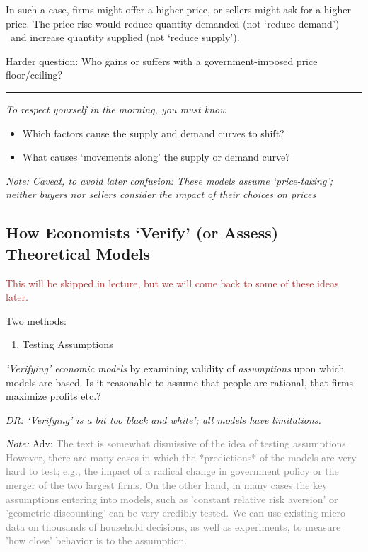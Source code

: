 \documentclass[]{article}
\providecommand{\tightlist}{%
  \setlength{\itemsep}{0pt}\setlength{\parskip}{0pt}}
\begin{document}
In such a case, firms might offer a higher price, or sellers might ask for a higher price. The price rise would reduce quantity demanded (not `reduce demand') ~and increase quantity supplied (not `reduce supply').

\bigskip

\textcolor{RawSienna}{Harder question: Who gains or suffers with a government-imposed price floor/ceiling?}

\begin{center}\rule{0.5\linewidth}{\linethickness}\end{center}

\emph{To respect yourself in the morning, you must know}

\begin{itemize}
\item
  Which factors cause the supply and demand curves to shift?
\item
  What causes `movements along' the supply or demand curve?
\end{itemize}

\emph{Note: Caveat, to avoid later confusion: These models assume `price-taking'; neither buyers nor sellers consider the impact of their choices on prices}

\hypertarget{how-economists-verify-or-assess-theoretical-models}{%
\subsection{How Economists `Verify' (or Assess) Theoretical Models}\label{how-economists-verify-or-assess-theoretical-models}}

\textcolor{brown}{This will be skipped in lecture, but we will come back to some of these ideas later.}

Two methods:

\begin{enumerate}
\def\labelenumi{\arabic{enumi}.}
\tightlist
\item
  Testing Assumptions
\end{enumerate}

\emph{`Verifying' economic models} by examining validity of \emph{assumptions} upon which models are based. Is it reasonable to assume that people are rational, that firms maximize profits etc.?

\emph{DR: `Verifying' is a bit too black and white'; all models have limitations.}

\bigskip

\emph{Note:} \textcolor{RawSienna}{Adv:} \textcolor{gray}{The text is somewhat dismissive of the idea of testing assumptions.  However, there are many cases in which the *predictions* of the models are very hard to test; e.g., the impact of a radical change in government policy or the merger of the two largest firms.  On the other hand, in many cases the key assumptions entering into models, such as 'constant relative risk aversion' or 'geometric discounting' can be very credibly tested.  We can use existing micro data on thousands of household decisions, as well as experiments, to measure 'how close' behavior is to the assumption.}
\end{document}
